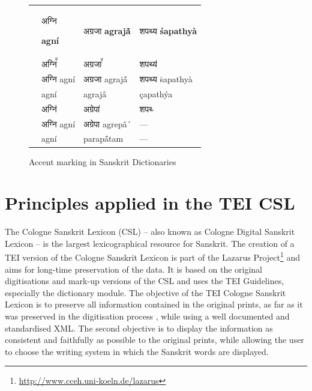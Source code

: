 \begin{figure}[!ht]
\begin{center}
\begingroup
\setlength{\tabcolsep}{10pt} %
\renewcommand{\arraystretch}{1.5} %
\begin{tabular}{llll}
  & \begin{devbfont}अग्नि\end{devbfont} \bfseries{agní}& {\devbfont अग्रजा} \bfseries{agrajā́} & {\devbfont शपथ्य} \bfseries{śapathyà}\\
 \citet{pwg} & {\devfont अग्नि꣫} & {\devfont अग्रजा꣫} & {\devfont शपथ्य॑}\\
 \citet{mw} & {\devfont अग्नि} agní & {\devfont अग्रजा} agrajā́ & {\devfont शपथ्य} ṡapathyà \\
 \citet{gra} & agní & agrajâ & çapathýa \\
 \citet{ccs,cae}  & {\devfont अग्नि॑} & {\devfont अग्रेपा॑} & {\devfont शपथ्य᳗}\\
\citet{md}  & {\devfont अग्नि} agní & {\devfont अग्रेपा} agrepâ´ & — \\
\citet{sch} & agní & parapā́tam & —
\end{tabular}
\endgroup
\end{center}
\caption[Accent marking in Sanskrit Dictionaries]{\label{tab:summary}Accent marking in Sanskrit Dictionaries}
\end{figure}

\chapter{Principles applied in the TEI CSL}

The Cologne Sanskrit Lexicon (CSL)\citep{markingMonier,KappMalten1997} – also known as Cologne Digital Sanskrit Lexicon – is the largest lexicographical resource for Sanskrit. The creation of a TEI version of the Cologne Sanskrit Lexicon is part of the Lazarus Project\footnote{\url{http://www.cceh.uni-koeln.de/lazarus}} and aims for long-time preservation of the data. It is based on the original digitisations and mark-up versions of the CSL and uses the TEI Guidelines, especially the dictionary module. The objective of the TEI Cologne Sanskrit Lexicon is to preserve all information contained in the original prints, as far as it was preserved in the digitisation process \citep[][as described in]{KappMalten1997}, while using a well documented and standardised XML. The second objective is to display the information as consistent and faithfully as possible to the original prints, while allowing the user to choose the writing system in which the Sanskrit words are displayed.


